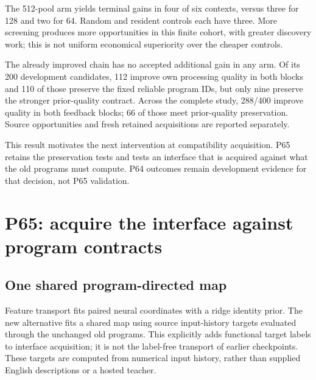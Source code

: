 \documentclass[11pt]{article}
\begin{document}
\begin{table}[ht]\centering\small
\caption{P64 terminal results across six contexts. Work counts include screening and recruited-port queries; the base component runtime is counted separately. No arm adds a retained gain on the prespecified already-improved deep chain.}\label{tab:recruitment}
\end{table}

The 512-pool arm yields terminal gains in four of six contexts, versus three for 128 and two for 64. Random and resident controls each have three. More screening produces more opportunities in this finite cohort, with greater discovery work; this is not uniform economical superiority over the cheaper controls.

The already improved chain has no accepted additional gain in any arm. Of its 200 development candidates, 112 improve own processing quality in both blocks and 110 of those preserve the fixed reliable program IDs, but only nine preserve the stronger prior-quality contract. Across the complete study, 288/400 improve quality in both feedback blocks; 66 of those meet prior-quality preservation. Source opportunities and fresh retained acquisitions are reported separately.

This result motivates the next intervention at compatibility acquisition. P65 retains the preservation tests and tests an interface that is acquired against what the old programs must compute. P64 outcomes remain development evidence for that decision, not P65 validation.

\section{P65: acquire the interface against program contracts}
\subsection{One shared program-directed map}
Feature transport fits paired neural coordinates with a ridge identity prior. The new alternative fits a shared map using source input-history targets evaluated through the unchanged old programs. This explicitly adds functional target labels to interface acquisition; it is not the label-free transport of earlier checkpoints. These targets are computed from numerical input history, rather than supplied English descriptions or a hosted teacher.
\end{document}
